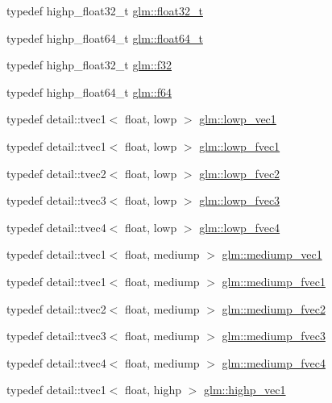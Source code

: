 \begin{CompactItemize}
\item 
typedef highp\_\-float32\_\-t \hyperlink{group__gtc__type__precision_g642737ae3e7c434b366f2191e6944bf2}{glm::float32\_\-t}
\item 
typedef highp\_\-float64\_\-t \hyperlink{group__gtc__type__precision_gde966a3eb25ebeb16dd53c40d3fdeb46}{glm::float64\_\-t}
\item 
typedef highp\_\-float32\_\-t \hyperlink{group__gtc__type__precision_g0ec999b57f5330d9021256e96038df04}{glm::f32}
\item 
typedef highp\_\-float64\_\-t \hyperlink{group__gtc__type__precision_g2bba392e555124b36cde6abba349bab3}{glm::f64}
\item 
typedef detail::tvec1$<$ float, lowp $>$ \hyperlink{group__gtc__type__precision_ge48c64f920be353ece773ff367f0161c}{glm::lowp\_\-vec1}
\item 
typedef detail::tvec1$<$ float, lowp $>$ \hyperlink{group__gtc__type__precision_gd5266f0507395cf8cdfe84b9cf5496e4}{glm::lowp\_\-fvec1}
\item 
typedef detail::tvec2$<$ float, lowp $>$ \hyperlink{group__gtc__type__precision_gf365442c52322b810bc0ed943e539229}{glm::lowp\_\-fvec2}
\item 
typedef detail::tvec3$<$ float, lowp $>$ \hyperlink{group__gtc__type__precision_g83d77dfe136d4add9e214cd205320c12}{glm::lowp\_\-fvec3}
\item 
typedef detail::tvec4$<$ float, lowp $>$ \hyperlink{group__gtc__type__precision_g0d016cdbff067c450122115d0620bf85}{glm::lowp\_\-fvec4}
\item 
typedef detail::tvec1$<$ float, mediump $>$ \hyperlink{group__gtc__type__precision_g1b734d715033ab3026b2fb27e1fb7d3e}{glm::mediump\_\-vec1}
\item 
typedef detail::tvec1$<$ float, mediump $>$ \hyperlink{group__gtc__type__precision_g4534af301d5260974cee29f76842d579}{glm::mediump\_\-fvec1}
\item 
typedef detail::tvec2$<$ float, mediump $>$ \hyperlink{group__gtc__type__precision_g5c2686caa6838515f6727eea1b64aa05}{glm::mediump\_\-fvec2}
\item 
typedef detail::tvec3$<$ float, mediump $>$ \hyperlink{group__gtc__type__precision_g710c3af5ebb05e5e863cff78affd25a6}{glm::mediump\_\-fvec3}
\item 
typedef detail::tvec4$<$ float, mediump $>$ \hyperlink{group__gtc__type__precision_gba16de142de00531a1598d83716c6939}{glm::mediump\_\-fvec4}
\item 
typedef detail::tvec1$<$ float, highp $>$ \hyperlink{group__gtc__type__precision_gb3f08c031846e7a95b49e81c48d920d3}{glm::highp\_\-vec1}

\end{CompactItemize}
